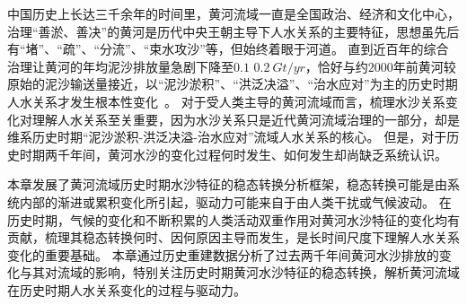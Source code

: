 

中国历史上长达三千余年的时间里，黄河流域一直是全国政治、经济和文化中心，治理“善淤、善决”的黄河是历代中央王朝主导下人\textendash{}水关系的主要特征，思想虽先后有“堵”、“疏”、“分流”、“束水攻沙”等，但始终着眼于河道\cite{WangWeiJing2009}。
直到近百年的综合治理让黄河的年均泥沙排放量急剧下降至$0.1$ \textendash{} $0.2~Gt/yr$，恰好与约$2000$年前黄河较原始的泥沙输送量接近，以“泥沙淤积”、“洪泛决溢”、“治水应对”为主的历史时期人\textendash{}水关系才发生根本性变化~\cite{wang2007,song2020, wang2016a}。
对于受人类主导的黄河流域而言，梳理水沙关系变化对理解人\textendash{}水关系至关重要，因为水沙关系只是近代黄河流域治理的一部分，却是维系历史时期“泥沙淤积-洪泛决溢-治水应对”流域人\textendash{}水关系的核心。
但是，对于历史时期两千年间，黄河水沙的变化过程何时发生、如何发生却尚缺乏系统认识。


本章发展了黄河流域历史时期水沙特征的稳态转换分析框架，稳态转换可能是由系统内部的渐进或累积变化所引起，驱动力可能来自于由人类干扰或气候波动。
在历史时期，气候的变化和不断积累的人类活动双重作用对黄河水沙特征的变化均有贡献，梳理其稳态转换何时、因何原因主导而发生，是长时间尺度下理解人\textendash{}水关系变化的重要基础。
本章通过历史重建数据分析了过去两千年间黄河水沙排放的变化与其对流域的影响，特别关注历史时期黄河水沙特征的稳态转换，解析黄河流域在历史时期人\textendash{}水关系变化的过程与驱动力。



